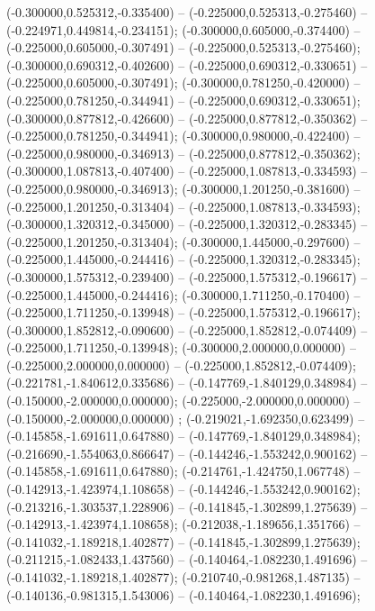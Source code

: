  (-0.300000,0.525312,-0.335400) -- (-0.225000,0.525313,-0.275460) -- (-0.224971,0.449814,-0.234151);
 (-0.300000,0.605000,-0.374400) -- (-0.225000,0.605000,-0.307491) -- (-0.225000,0.525313,-0.275460);
 (-0.300000,0.690312,-0.402600) -- (-0.225000,0.690312,-0.330651) -- (-0.225000,0.605000,-0.307491);
 (-0.300000,0.781250,-0.420000) -- (-0.225000,0.781250,-0.344941) -- (-0.225000,0.690312,-0.330651);
 (-0.300000,0.877812,-0.426600) -- (-0.225000,0.877812,-0.350362) -- (-0.225000,0.781250,-0.344941);
 (-0.300000,0.980000,-0.422400) -- (-0.225000,0.980000,-0.346913) -- (-0.225000,0.877812,-0.350362);
 (-0.300000,1.087813,-0.407400) -- (-0.225000,1.087813,-0.334593) -- (-0.225000,0.980000,-0.346913);
 (-0.300000,1.201250,-0.381600) -- (-0.225000,1.201250,-0.313404) -- (-0.225000,1.087813,-0.334593);
 (-0.300000,1.320312,-0.345000) -- (-0.225000,1.320312,-0.283345) -- (-0.225000,1.201250,-0.313404);
 (-0.300000,1.445000,-0.297600) -- (-0.225000,1.445000,-0.244416) -- (-0.225000,1.320312,-0.283345);
 (-0.300000,1.575312,-0.239400) -- (-0.225000,1.575312,-0.196617) -- (-0.225000,1.445000,-0.244416);
 (-0.300000,1.711250,-0.170400) -- (-0.225000,1.711250,-0.139948) -- (-0.225000,1.575312,-0.196617);
 (-0.300000,1.852812,-0.090600) -- (-0.225000,1.852812,-0.074409) -- (-0.225000,1.711250,-0.139948);
 (-0.300000,2.000000,0.000000) -- (-0.225000,2.000000,0.000000) -- (-0.225000,1.852812,-0.074409);
 (-0.221781,-1.840612,0.335686) -- (-0.147769,-1.840129,0.348984) -- (-0.150000,-2.000000,0.000000);
 (-0.225000,-2.000000,0.000000) -- (-0.150000,-2.000000,0.000000) ;
 (-0.219021,-1.692350,0.623499) -- (-0.145858,-1.691611,0.647880) -- (-0.147769,-1.840129,0.348984);
 (-0.216690,-1.554063,0.866647) -- (-0.144246,-1.553242,0.900162) -- (-0.145858,-1.691611,0.647880);
 (-0.214761,-1.424750,1.067748) -- (-0.142913,-1.423974,1.108658) -- (-0.144246,-1.553242,0.900162);
 (-0.213216,-1.303537,1.228906) -- (-0.141845,-1.302899,1.275639) -- (-0.142913,-1.423974,1.108658);
 (-0.212038,-1.189656,1.351766) -- (-0.141032,-1.189218,1.402877) -- (-0.141845,-1.302899,1.275639);
 (-0.211215,-1.082433,1.437560) -- (-0.140464,-1.082230,1.491696) -- (-0.141032,-1.189218,1.402877);
 (-0.210740,-0.981268,1.487135) -- (-0.140136,-0.981315,1.543006) -- (-0.140464,-1.082230,1.491696);
